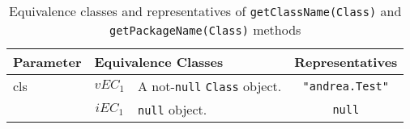 \documentclass[sigconf]{acmart}
\begin{document}
\begin{table*}
\footnotesize
\caption{Equivalence classes and representatives of \texttt{getClassName(Class)} and  \texttt{getPackageName(Class)} methods}
\label{getClassNameClassGetPackageNameClassEq}
\centering
\begin{tabular}{l|cm{10.5cm}|c}
\toprule
 
\textbf{Parameter} & \multicolumn{2}{|l|}{\textbf{Equivalence Classes}} & \textbf{Representatives} \\
\midrule
    
cls & $vEC_1$ & A not-\texttt{null} \texttt{Class} object. & \texttt{"andrea.Test"}

\\\cline{2-4}

& $iEC_1$ & \texttt{null} object. & \texttt{null}

\\

\bottomrule
\end{tabular}
\end{table*}







\end{document}
